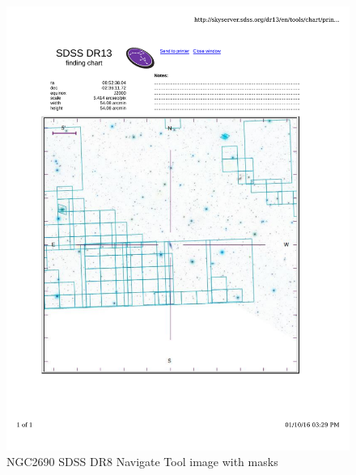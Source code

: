 \documentclass[10pt,letterpaper]{article}
\begin{document}
\begin{figure}[h!]
\centering
\includegraphics[scale=0.7]{figures/NGC2690.pdf}
\caption{NGC2690 SDSS DR8 Navigate Tool image with masks}
\end{figure}
\end{document}
